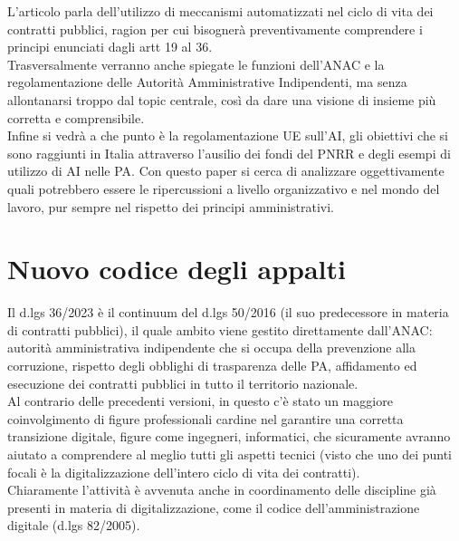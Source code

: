 \documentclass{article}
\begin{document}
\begin{justify}
L'articolo parla dell'utilizzo di meccanismi automatizzati nel ciclo di vita dei contratti pubblici, ragion per cui bisognerà preventivamente comprendere i principi enunciati dagli artt 19 al 36.\\
Trasversalmente verranno anche spiegate le funzioni dell'ANAC e la regolamentazione delle Autorità Amministrative Indipendenti, ma senza allontanarsi troppo dal topic centrale, così da dare una visione di insieme più corretta e comprensibile.\\
Infine si vedrà a che punto è la regolamentazione UE sull'AI, gli obiettivi che si sono raggiunti in Italia attraverso l'ausilio dei fondi del PNRR e degli esempi di utilizzo di AI nelle PA.
Con questo paper si cerca di analizzare oggettivamente quali potrebbero essere le ripercussioni a livello organizzativo e nel mondo del lavoro, pur sempre nel rispetto dei principi amministrativi.
\end{justify}

\centering
\section{Nuovo codice degli appalti}
\begin{justify}
    Il d.lgs 36/2023 è il continuum del d.lgs 50/2016 (il suo predecessore in materia di contratti pubblici), il quale ambito viene gestito direttamente dall'ANAC: autorità amministrativa indipendente che si occupa della prevenzione alla corruzione, rispetto degli obblighi di trasparenza delle PA, affidamento ed esecuzione dei contratti pubblici in tutto il territorio nazionale.\citep{AnacSite}\\
    Al contrario delle precedenti versioni, in questo c'è stato un maggiore coinvolgimento di figure professionali cardine nel garantire una corretta transizione digitale, figure come ingegneri, informatici, che sicuramente avranno aiutato a comprendere al meglio tutti gli aspetti tecnici (visto che uno dei punti focali è la digitalizzazione dell'intero ciclo di vita dei contratti).\\
    Chiaramente l'attività è avvenuta anche in coordinamento delle discipline già presenti in materia di digitalizzazione, come il codice dell'amministrazione digitale (d.lgs 82/2005).
\end{justify}
\end{document}
